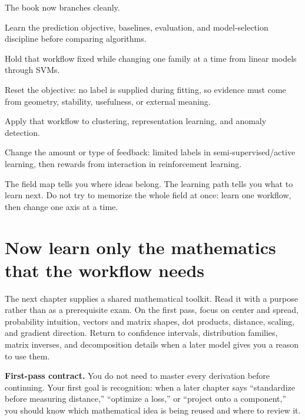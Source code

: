 The book now branches cleanly.

\begin{description}[leftmargin=1.55in,style=nextline]
  \item[Stage 3A: supervised workflow] Learn the prediction objective, baselines, evaluation, and model-selection discipline before comparing algorithms.
  \item[Stage 3B: supervised model families] Hold that workflow fixed while changing one family at a time from linear models through SVMs.
  \item[Stage 4A: unsupervised workflow] Reset the objective: no label is supplied during fitting, so evidence must come from geometry, stability, usefulness, or external meaning.
  \item[Stage 4B: unsupervised model families] Apply that workflow to clustering, representation learning, and anomaly detection.
  \item[Stage 5: other signals] Change the amount or type of feedback: limited labels in semi-supervised/active learning, then rewards from interaction in reinforcement learning.
\end{description}

\begin{keyidea}
The field map tells you where ideas belong. The learning path tells you what to learn next. Do not try to memorize the whole field at once: learn one workflow, then change one axis at a time.
\end{keyidea}

\section{Now learn only the mathematics that the workflow needs}

The next chapter supplies a shared mathematical toolkit. Read it with a purpose rather than as a prerequisite exam. On the first pass, focus on center and spread, probability intuition, vectors and matrix shapes, dot products, distance, scaling, and gradient direction. Return to confidence intervals, distribution families, matrix inverses, and decomposition details when a later model gives you a reason to use them.

\begin{firstread}
\textbf{First-pass contract.} You do not need to master every derivation before continuing. Your first goal is recognition: when a later chapter says ``standardize before measuring distance,'' ``optimize a loss,'' or ``project onto a component,'' you should know which mathematical idea is being reused and where to review it.
\end{firstread}


